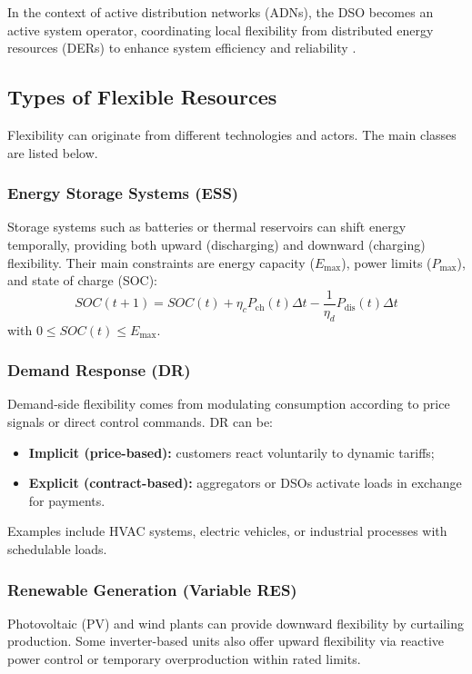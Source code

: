 \documentclass[11pt]{article}
\begin{document}
	In the context of active distribution networks (ADNs), the DSO becomes an active system operator, coordinating local flexibility from distributed energy resources (DERs) to enhance system efficiency and reliability \cite{CEDEC2019_flexibility,entsoe2023_flexibility}.
	
	\subsection{Types of Flexible Resources}
	
	Flexibility can originate from different technologies and actors.  
	The main classes are listed below.
	
	\subsubsection*{Energy Storage Systems (ESS)}
	Storage systems such as batteries or thermal reservoirs can shift energy temporally, providing both upward (discharging) and downward (charging) flexibility.  
	Their main constraints are energy capacity ($E_\text{max}$), power limits ($P_\text{max}$), and state of charge (SOC):
	\[
	SOC(t+1) = SOC(t) + \eta_c P_\text{ch}(t)\Delta t - \frac{1}{\eta_d} P_\text{dis}(t)\Delta t
	\]
	with $0 \le SOC(t) \le E_\text{max}$.
	
	\subsubsection*{Demand Response (DR)}
	Demand-side flexibility comes from modulating consumption according to price signals or direct control commands.  
	DR can be:
	\begin{itemize}
		\item \textbf{Implicit (price-based):} customers react voluntarily to dynamic tariffs;
		\item \textbf{Explicit (contract-based):} aggregators or DSOs activate loads in exchange for payments.
	\end{itemize}
	Examples include HVAC systems, electric vehicles, or industrial processes with schedulable loads.
	
	\subsubsection*{Renewable Generation (Variable RES)}
	Photovoltaic (PV) and wind plants can provide downward flexibility by curtailing production.  
	Some inverter-based units also offer upward flexibility via reactive power control or temporary overproduction within rated limits.
	
\end{document}
